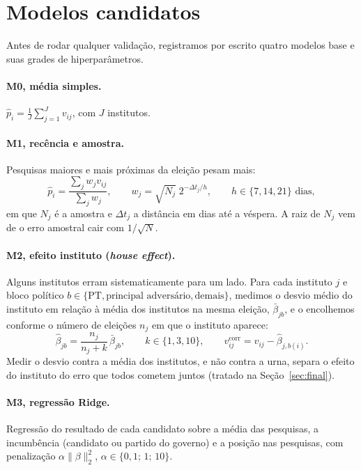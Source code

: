 \documentclass[10.5pt,a4paper]{article}
\begin{document}
\section{Modelos candidatos}

Antes de rodar qualquer validação, registramos por escrito quatro modelos base e suas grades de hiperparâmetros.

\paragraph{M0, média simples.} $\hat p_i=\frac{1}{J}\sum_{j=1}^{J}v_{ij}$, com $J$ institutos.

\paragraph{M1, recência e amostra.} Pesquisas maiores e mais próximas da eleição pesam mais:
\begin{equation}
\hat p_i=\frac{\sum_j w_j v_{ij}}{\sum_j w_j},\qquad w_j=\sqrt{N_j}\;2^{-\Delta t_j/h},\qquad h\in\{7,14,21\}\text{ dias},
\end{equation}
em que $N_j$ é a amostra e $\Delta t_j$ a distância em dias até a véspera. A raiz de $N_j$ vem de o erro amostral cair com $1/\sqrt{N}$.

\paragraph{M2, efeito instituto (\emph{house effect}).} Alguns institutos erram sistematicamente para um lado. Para cada instituto $j$ e bloco político $b\in\{\text{PT},\text{principal adversário},\text{demais}\}$, medimos o desvio médio do instituto em relação à média dos institutos na mesma eleição, $\bar\beta_{jb}$, e o encolhemos conforme o número de eleições $n_j$ em que o instituto aparece:
\begin{equation}
\hat\beta_{jb}=\frac{n_j}{n_j+k}\,\bar\beta_{jb},\qquad k\in\{1,3,10\},\qquad v^{\text{corr}}_{ij}=v_{ij}-\hat\beta_{j,b(i)} .
\end{equation}
Medir o desvio contra a média dos institutos, e não contra a urna, separa o efeito do instituto do erro que todos cometem juntos (tratado na Seção~\ref{sec:final}).

\paragraph{M3, regressão Ridge.} Regressão do resultado de cada candidato sobre a média das pesquisas, a incumbência (candidato ou partido do governo) e a posição nas pesquisas, com penalização $\alpha\|\beta\|_2^2$, $\alpha\in\{0{,}1;\,1;\,10\}$.
\end{document}
